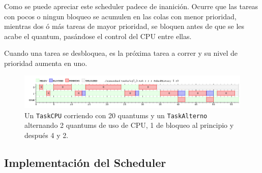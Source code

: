 	Como se puede apreciar este scheduler padece de inanición. Ocurre que las
	tareas con pocos o ningun bloqueo se acumulen en las colas con menor
	prioridad, mientras dos ó más tareas de mayor prioridad, se bloquen antes de
	que se les acabe el quantum, pasándose el control del CPU entre
	ellas.
	
	Cuando una tarea se desbloquea, es la próxima tarea a correr y su nivel de prioridad aumenta en uno.

	\begin{figure}[ht]
		\begin{center}
			\includegraphics[width=1\columnwidth]{imagenes/ej7_3.png}
			\caption{Un \texttt{TaskCPU} corriendo con 20 quantums y un
			\texttt{TaskAlterno} alternando 2 quantums de uso de CPU, 1 de bloqueo al principio y después 4 y 2.}
		\end{center}
	\end{figure}

	\subsection{Implementación del Scheduler}

